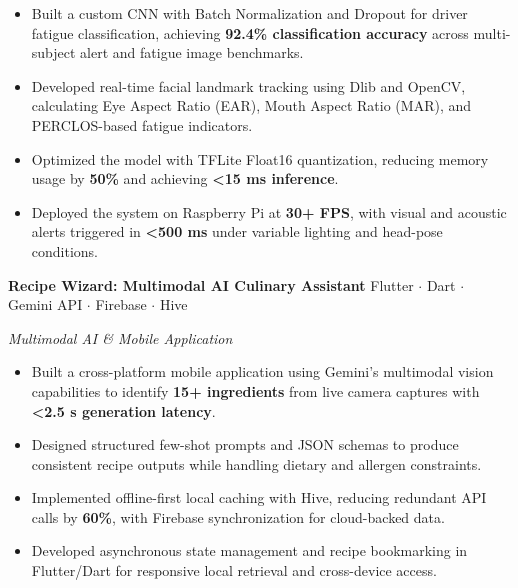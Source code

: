 \documentclass[10pt,a4paper]{article}
\newcommand{\resumeProject}[3]{
    \vspace{2pt}
    \textbf{\color{heading}#1}
    \hfill
    {\small\textcolor{textgray}{#2}}

    {\small\textit{#3}}
    \vspace{1pt}
}
\begin{document}
\begin{itemize}

    \item Built a custom CNN with Batch Normalization and Dropout for driver fatigue
    classification, achieving \textbf{92.4\% classification accuracy} across
    multi-subject alert and fatigue image benchmarks.

    \item Developed real-time facial landmark tracking using Dlib and OpenCV,
    calculating Eye Aspect Ratio (EAR), Mouth Aspect Ratio (MAR), and
    PERCLOS-based fatigue indicators.

    \item Optimized the model with TFLite Float16 quantization, reducing memory
    usage by \textbf{50\%} and achieving \textbf{<15 ms inference}.

    \item Deployed the system on Raspberry Pi at \textbf{30+ FPS}, with visual and
    acoustic alerts triggered in \textbf{<500 ms} under variable lighting
    and head-pose conditions.

\end{itemize}


\resumeProject
{Recipe Wizard: Multimodal AI Culinary Assistant}
{Flutter $\cdot$ Dart $\cdot$ Gemini API $\cdot$ Firebase $\cdot$ Hive}
{Multimodal AI \& Mobile Application}

\begin{itemize}

    \item Built a cross-platform mobile application using Gemini's multimodal
    vision capabilities to identify \textbf{15+ ingredients} from live camera
    captures with \textbf{<2.5 s generation latency}.

    \item Designed structured few-shot prompts and JSON schemas to produce
    consistent recipe outputs while handling dietary and allergen constraints.

    \item Implemented offline-first local caching with Hive, reducing redundant
    API calls by \textbf{60\%}, with Firebase synchronization for cloud-backed data.

    \item Developed asynchronous state management and recipe bookmarking in
    Flutter/Dart for responsive local retrieval and cross-device access.

\end{itemize}
\end{document}
